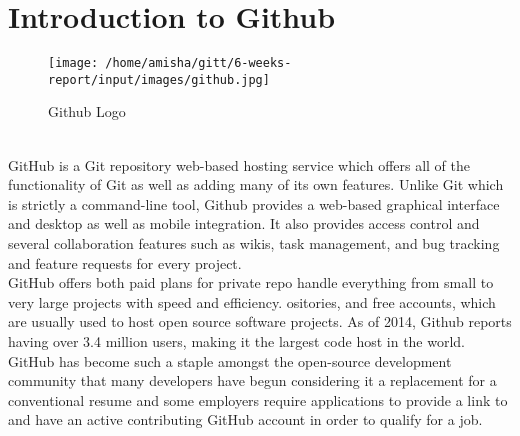 
\section{Introduction to Github}
\begin{figure}[!ht]
\centering
\texttt{[image: /home/amisha/gitt/6-weeks-report/input/images/github.jpg]}                   
\caption{Github Logo}
\hspace{-1.5em}
\end{figure}
\leavevmode\\
GitHub is a Git repository web-based hosting service which offers all of the functionality of Git as well as adding many of its own features. Unlike Git which is strictly a command-line tool, Github provides a web-based graphical interface and desktop as well as mobile integration. It also provides access control and several collaboration features such as wikis, task management, and bug tracking and feature requests for every project.\\

GitHub offers both paid plans for private repo handle everything from small to very large projects with speed and efficiency. ositories, and free accounts, which are usually used to host open source software projects. As of 2014, Github reports having over 3.4 million users, making it the largest code host in the world.\\

GitHub has become such a staple amongst the open-source development community that many developers have begun considering it a replacement for a conventional resume and some employers require applications to provide a link to and have an active contributing GitHub account in order to qualify for a job.\\


